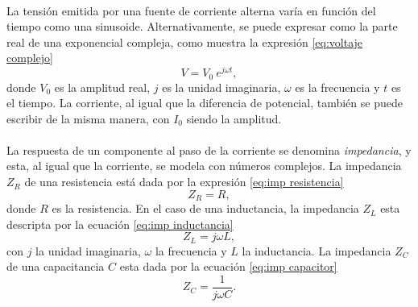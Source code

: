 


\paragraph{}
La tensión emitida por una fuente de corriente alterna varía en función del tiempo como una sinusoide. Alternativamente, se puede expresar como la parte real de una exponencial compleja, como muestra la expresión \eqref{eq:voltaje complejo} \cite{roederer}
\begin{equation}\label{eq:voltaje complejo}
    V=V_0 \ e^{j\omega t},
\end{equation}
donde $V_0$ es la amplitud real, $j$ es la unidad imaginaria, $\omega$ es la frecuencia y $t$ es el tiempo. La corriente, al igual que la diferencia de potencial, también se puede escribir de la misma manera, con $I_0$ siendo la amplitud.
\paragraph{}
La respuesta de un componente al paso de la corriente se denomina \emph{impedancia}, y esta, al igual que la corriente, se modela con números complejos. La impedancia $Z_R$ de una resistencia está dada por la expresión \eqref{eq:imp resistencia} \cite{roederer}
\begin{equation}\label{eq:imp resistencia}
    Z_R=R,
\end{equation}
donde $R$ es la resistencia. En el caso de una inductancia, la impedancia $Z_L$ esta descripta por la ecuación \eqref{eq:imp inductancia} 
\begin{equation}\label{eq:imp inductancia}
    Z_L = j\omega L,
\end{equation}
con $j$ la unidad imaginaria, $\omega$ la frecuencia y $L$ la inductancia. La impedancia $Z_C$ de una capacitancia $C$ esta dada por la ecuación \eqref{eq:imp capacitor}
\begin{equation}\label{eq:imp capacitor}
    Z_C = \frac{1}{j\omega C}.
\end{equation}
